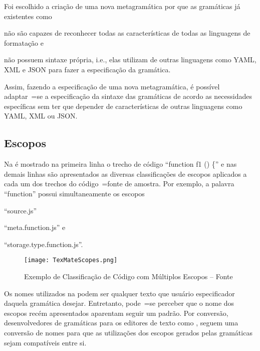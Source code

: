 Foi escolhido a criação de uma nova metagramática por que as gramáticas já existentes como 
\begin{inparaenum}[1)]
\item não são capazes de reconhecer todas as características de todas as linguagens de formatação e
\item não possuem sintaxe própria,
i.e.,
elas utilizam de outras linguagens como YAML,
XML e
JSON para fazer a especificação da gramática.
\end{inparaenum}
Assim,
fazendo a especificação de uma nova metagramática,
é possível adaptar~=se a especificação da sintaxe das gramáticas de acordo as necessidades específicas sem ter que depender de características de outras linguagens como YAML,
XML ou
JSON.


\subsection{Escopos}

Na  é mostrado na primeira linha o trecho de código ``function f1 () \{'' e
nas demais linhas são apresentados as diversas classificações de escopos aplicados a cada um dos trechos do código~=fonte de amostra.
Por exemplo, a palavra ``function'' possui simultaneamente os escopos
\begin{inparaenum}[1)]
\item ``source.js''
\item ``meta.function.js'' e
\item ``storage.type.function.js''.
\end{inparaenum}
\begin{figure}[h]
\centering
\texttt{[image: TexMateScopes.png]}
\caption[Exemplo de Classificação de Código com Múltiplos Escopos]{Exemplo de Classificação de Código com Múltiplos Escopos -- Fonte }
\label{TexMateScopes}
\end{figure}

Os nomes utilizados na  podem ser qualquer texto que usuário especificador daquela gramática desejar.
Entretanto,
pode~=se perceber que o nome dos escopos recém apresentados aparentam seguir um padrão.
Por conversão,
desenvolvedores de gramáticas para os editores de texto como ,
seguem uma conversão de nomes para que as utilizações dos escopos gerados pelas gramáticas sejam compatíveis entre si.

